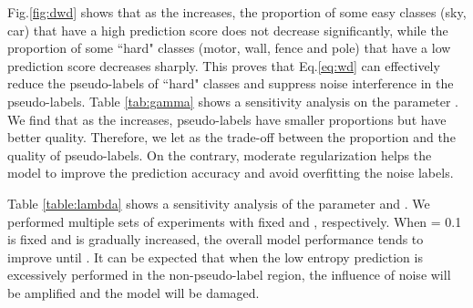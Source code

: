 \documentclass[runningheads]{llncs}
\begin{document}
\begin{table}[htb]
{{}
\label{table:alpha}
}
\hfill
\parbox{.50\linewidth}{
\scriptsize
\centering
\caption{ and  sensitivity analysis (GTA5 to Cityscapes)}
\label{table:lambda}
}
\end{table}






Fig.\ref{fig:dwd} shows that as the  increases, the proportion of some easy classes (sky, car) that have a high prediction score does not decrease significantly, while the proportion of some ``hard" classes (motor, wall, fence and pole) that have a low prediction score decreases sharply. This proves that Eq.\eqref{eq:wd} can effectively reduce the pseudo-labels of ``hard" classes and suppress noise interference in the pseudo-labels. Table \ref{tab:gamma} shows a sensitivity analysis on the parameter . We find that as the  increases, pseudo-labels have smaller proportions but have better quality. Therefore, we let  as the trade-off between the proportion and the quality of pseudo-labels. On the contrary, moderate regularization helps the model to improve the prediction accuracy and avoid overfitting the noise labels.

Table \ref{table:lambda} shows a sensitivity analysis of the parameter  and . We performed multiple sets of experiments with fixed  and , respectively. When  = 0.1 is fixed and  is gradually increased, the overall model performance tends to improve until . It can be expected that when the low entropy prediction is excessively performed in the non-pseudo-label region, the influence of noise will be amplified and the model will be damaged.
\end{document}
